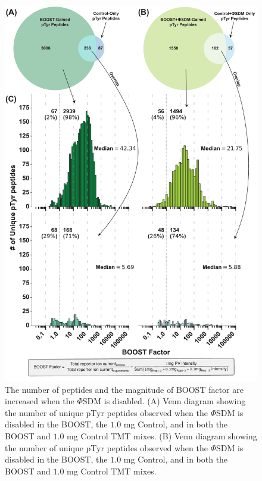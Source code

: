 \documentclass[journal=jprobs,manuscript=article]{achemso}
\begin{document}
\begin{figure}
\centering
\includegraphics[width=135mm]{figures/main_figs/boost_factor.pdf}
\caption{The number of peptides and the magnitude of BOOST factor are increased when the $\Phi$SDM is disabled. (A) Venn diagram showing the number of unique pTyr peptides observed when the $\Phi$SDM is disabled  in the BOOST, the $1.0$ mg Control, and in both the BOOST and $1.0$ mg Control TMT mixes. (B) Venn diagram showing the number of unique pTyr peptides observed when the $\Phi$SDM is disabled  in the BOOST, the $1.0$ mg Control, and in both the BOOST and $1.0$ mg Control TMT mixes. }\label{boost_factor}
\end{figure}
\end{document}
